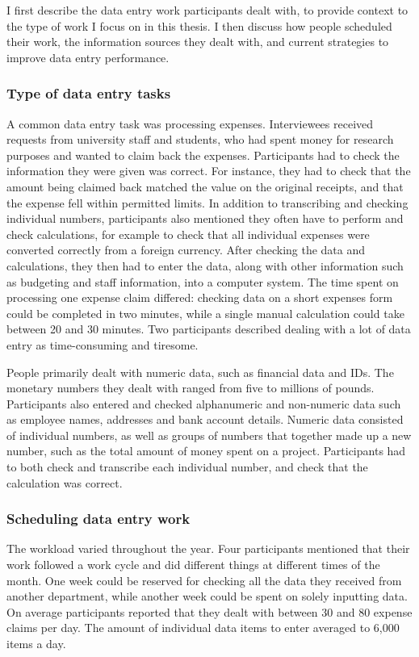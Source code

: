 I first describe the data entry work participants dealt with, to provide context to the type of work I focus on in this thesis. I then discuss how people scheduled their work, the information sources they dealt with, and current strategies to improve data entry performance.

\subsubsection{Type of data entry tasks}
A common data entry task was processing expenses. Interviewees received requests from university staff and students, who had spent money for research purposes and wanted to claim back the expenses. Participants had to check the information they were given was correct. For instance, they had to check that the amount being claimed back matched the value on the original receipts, and that the expense fell within permitted limits. In addition to transcribing and checking individual numbers, participants also mentioned they often have to perform and check calculations, for example to check that all individual expenses were converted correctly from a foreign currency. After checking the data and calculations, they then had to enter the data, along with other information such as budgeting and staff information, into a computer system. The time spent on processing one expense claim differed: checking data on a short expenses form could be completed in two minutes, while a single manual calculation could take between 20 and 30 minutes. Two participants described dealing with a lot of data entry as time-consuming and tiresome.

People primarily dealt with numeric data, such as financial data and IDs. The monetary numbers they dealt with ranged from five to millions of pounds. Participants also entered and checked alphanumeric and non-numeric data such as employee names, addresses and bank account details. Numeric data consisted of individual numbers, as well as groups of numbers that together made up a new number, such as the total amount of money spent on a project. Participants had to both check and transcribe each individual number, and check that the calculation was correct. 

\subsubsection{Scheduling data entry work}
The workload varied throughout the year. Four participants mentioned that their work followed a work cycle and did different things at different times of the month. One week could be reserved for checking all the data they received from another department, while another week could be spent on solely inputting data. On average participants reported that they dealt with between 30 and 80 expense claims per day. The amount of individual data items to enter averaged to 6,000 items a day. 

